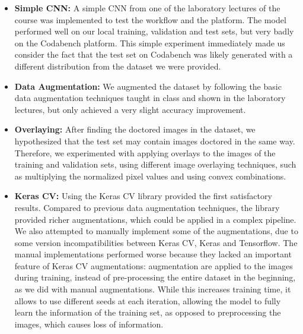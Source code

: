 \documentclass[11pt]{article}
\begin{document}
\begin{multicols}{2}
      \begin{itemize}
            \item \textbf{Simple CNN:} A simple CNN from one of the laboratory lectures
                  of the course was implemented to test the workflow and the platform.
                  The model performed well on our local training, validation and test 
                  sets, but very badly on the Codabench platform. This simple experiment 
                  immediately made us consider the fact that the test set on Codabench 
                  was likely generated with a different distribution from the dataset 
                  we were provided.
            \item \textbf{Data Augmentation:} We augmented the dataset by
                  following the basic data augmentation techniques taught in class and
                  shown in the laboratory lectures, but only achieved a very slight
                  accuracy improvement.
            \item \textbf{Overlaying:} After finding the doctored images in the
                  dataset, we hypothesized that the test set may contain images
                  doctored in the same way. Therefore, we experimented with applying
                  overlays to the images of the training and validation sets, using
                  different image overlaying techniques, such as multiplying the 
                  normalized pixel values and using convex combinations.
            \item \textbf{Keras CV:} Using the Keras CV library provided the first
                  satisfactory results. Compared to previous data augmentation techniques,
                  the library provided richer augmentations, which could be applied
                  in a complex pipeline. We also attempted to manually implement
                  some of the augmentations, due to some version incompatibilities
                  between Keras CV, Keras and Tensorflow. The manual implementations 
                  performed worse because they lacked an important feature of Keras CV
                  augmentations: augmentation are applied to the images during training, 
                  instead of pre-processing the entire dataset in the beginning, as we
                  did with manual augmentations. While this increases training time,
                  it allows to use different seeds at each iteration, allowing the model
                  to fully learn the information of the training set, as opposed to
                  preprocessing the images, which causes loss of information.

\end{itemize}
\end{multicols}
\end{document}
